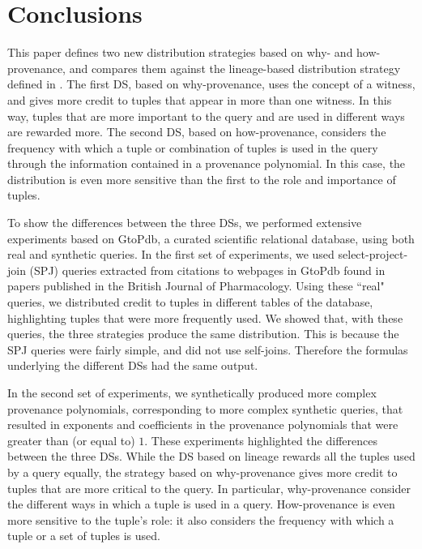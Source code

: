 \section{Conclusions}
\label{section:conclusions}

This paper 
defines two new distribution strategies based on why- and how-provenance, and compares them against the lineage-based distribution strategy defined in \cite{dosso2020data}. 
The first DS, based on why-provenance, uses the concept of a witness, and gives more credit to tuples that appear in more than one witness. 
In this way, tuples that are more important to the query and are used in different ways are rewarded more. %
The second DS, based on how-provenance, considers the frequency with which a tuple or combination of tuples is used in the query through the information contained in a provenance polynomial. In this case, the distribution is even more sensitive than the first to the role and importance of tuples.

To show the differences between the three DSs, we performed extensive experiments based on GtoPdb, a curated scientific relational database, using both real and synthetic queries. 
In the first set of experiments, we used select-project-join (SPJ) queries extracted from citations to webpages in GtoPdb found in papers published in the British Journal of Pharmacology. 
Using these ``real" queries, we distributed credit to tuples in different tables of the database, highlighting tuples that were more frequently used. 
We showed that, with these queries, the three strategies produce the same distribution. This is because the SPJ queries were fairly simple, and did not use self-joins. Therefore the formulas underlying the different DSs had the same output.

In the second set of experiments, we synthetically produced more complex provenance polynomials, corresponding to more complex synthetic queries, that resulted in exponents and coefficients in the provenance polynomials that were greater than (or equal to) $1$.
These experiments highlighted the differences between the three DSs.
While the DS based on lineage rewards all the tuples used by a query equally, the strategy based on why-provenance gives more credit to  tuples that are more critical to the query. 
In particular, why-provenance consider the different ways in which a tuple is used in a query.  
How-provenance is even more sensitive to the tuple's role: it also considers the frequency with which a tuple or a set of tuples is used. %

